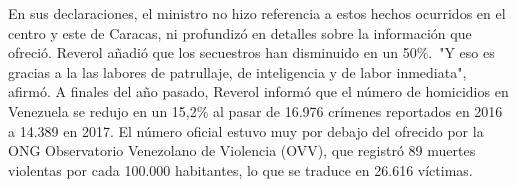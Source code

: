 \documentclass{article}%
\begin{document}
\newline%
%
En sus declaraciones, el ministro no hizo referencia a estos hechos ocurridos en el centro y este de Caracas, ni profundizó en detalles sobre la información que ofreció.%
\newline%
%
Reverol añadió que los secuestros han disminuido en un 50\%.~"Y eso es gracias a la las labores de patrullaje, de inteligencia y de labor inmediata", afirmó.%
\newline%
%
A finales del año pasado, Reverol informó que el número de homicidios en Venezuela se redujo en un 15,2\% al pasar de 16.976 crímenes reportados en 2016 a 14.389 en 2017.%
\newline%
%
El número oficial estuvo muy por debajo del ofrecido por la ONG Observatorio Venezolano de Violencia (OVV), que registró 89 muertes violentas por cada 100.000 habitantes, lo que se traduce en 26.616 víctimas.%
\newline%
%
\end{document}

